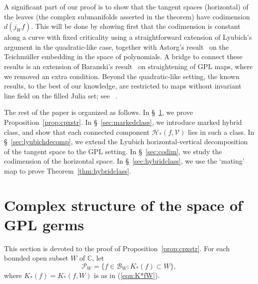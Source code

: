 \documentclass{amsart}
\numberwithin{equation}{section}
\newcommand{\C}{\mathbb C}
\theoremstyle{definition}
\theoremstyle{remark}
\begin{document}
A significant part of our proof is to show that the tangent spaces (horizontal) of the leaves (the complex submanifolds asserted in the theorem) have codimension $d(j_Wf)$.  This will be done by showing first that the codimension is constant along a curve with fixed criticality using a straightforward extension of Lyubich's argument in the quadratic-like case, together with Astorg's result~\cite{Astorg} on the Teichm\"uller embedding in the space of polynomials. A bridge to connect these results is an extension of Baranski's result~\cite[Corollary 9]{Baranski} on straightening of GPL maps, where we removed an extra condition. Beyond the quadratic-like setting, the known results, to the best of our knowledge, are restricted to maps without invariant line field on the filled Julia set; see ~\cite{ALM, Smania}.


The rest of the paper is organized as follows. In \S~\ref{sec:space}, we prove Proposition~\ref{prop:cpxstr}. In \S~\ref{sec:markedclass}, we introduce marked hybrid class, and show that each connected component $\mathcal{H}_*(f,\mathcal{V})$ lies in such a class. In \S~\ref{sec:lyubichdecomp}, we extend the Lyubich horizontal-vertical decomposition of the tangent space to the GPL setting. In \S~\ref{sec:codim}, we study the codimension of the horizontal space.  In \S~\ref{sec:hybridclass}, we use the `mating' map to prove Theorem~\ref{thm:hybridclass}. 
\section{Complex structure of the space of GPL germs}\label{sec:space}
This section is devoted to the proof of Proposition~\ref{prop:cpxstr}.
For each bounded open subset $W$ of $\C$, let
$$\mathcal{P}_W=\{f\in \mathcal{B}_W: K_*(f)\subset W\},$$
where $K_*(f)=K_*(f,W)$ is as in (\ref{eqn:K*fW}). 
\end{document}
